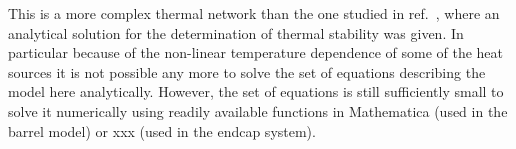 This is a more complex thermal network than the one studied in ref.~\cite{Beck:2010zzd}, where an analytical solution for the determination of thermal stability was given. In particular because of the non-linear temperature dependence of some of the heat sources it is not possible any more to solve the set of equations describing the model here analytically. However, the set of equations is still sufficiently small to solve it numerically using readily available functions in Mathematica (used in the barrel model) or xxx (used in the endcap system).
